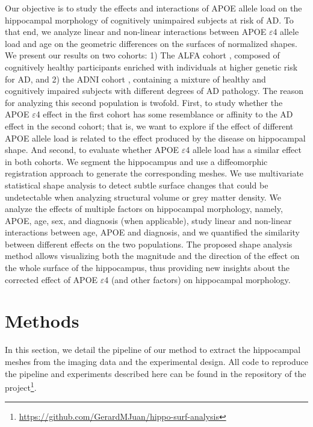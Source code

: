Our objective is to study the effects and interactions of APOE allele load on the hippocampal morphology of cognitively unimpaired subjects at risk of AD. To that end, we analyze linear and non-linear interactions between APOE $\varepsilon$4 allele load and age on the geometric differences on the surfaces of normalized shapes. We present our results on two cohorts: 1) The ALFA cohort \cite{Molinuevo2016}, composed of cognitively healthy participants enriched with individuals at higher genetic risk for AD, and 2) the ADNI cohort \cite{Mueller2005}, containing a mixture of healthy and cognitively impaired subjects with different degrees of AD pathology. The reason for analyzing this second population is twofold. First, to study whether the APOE $\varepsilon$4 effect in the first cohort has some resemblance or affinity to the AD effect in the second cohort; that is, we want to explore if the effect of different APOE allele load is related to the effect produced by the disease on hippocampal shape. And second, to evaluate whether APOE $\varepsilon$4 allele load has a similar effect in both cohorts. We segment the hippocampus and use a diffeomorphic registration approach to generate the corresponding meshes. We use multivariate statistical shape analysis to detect subtle surface changes that could be undetectable when analyzing structural volume or grey matter density. We analyze the effects of multiple factors on hippocampal morphology, namely, APOE, age, sex, and diagnosis (when applicable), study linear and non-linear interactions between age, APOE and diagnosis, and we quantified the similarity between different effects on the two populations. The proposed shape analysis method allows visualizing both the magnitude and the direction of the effect on the whole surface of the hippocampus, thus providing new insights about the corrected effect of APOE $\varepsilon$4 (and other factors) on hippocampal morphology.  \\

\section{Methods}
\label{sec:methods}

In this section, we detail the pipeline of our method to extract the hippocampal meshes from the imaging data and the experimental design. All code to reproduce the pipeline and experiments described here can be found in the repository of the project\footnote{\url{https://github.com/GerardMJuan/hippo-surf-analysis}}.

